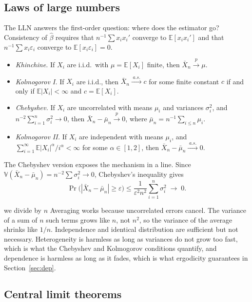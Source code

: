 \documentclass[11pt,a4paper]{article}
\newcommand{\E}{\mathbb{E}}
\newcommand{\V}{\mathbb{V}}
\newcommand{\cp}{\xrightarrow{\;p\;}}
\newcommand{\cas}{\xrightarrow{\;a.s.\;}}
\newcommand{\bh}{\hat\beta}
\newcommand{\iid}{i.i.d.}
\begin{document}
\subsection{Laws of large numbers}

The LLN answers the first-order question: where does the estimator go? Consistency of $\bh$ requires that $n^{-1}\sum x_ix_i'$ converge to $\E[x_ix_i']$ and that $n^{-1}\sum x_i\varepsilon_i$ converge to $\E[x_i\varepsilon_i]=0$.

\begin{theorem}\leavevmode
\begin{itemize}
\item \emph{Khinchine.} If $X_i$ are \iid\ with $\mu=\E[X_i]$ finite, then $\bar X_n\cp\mu$.
\item \emph{Kolmogorov I.} If $X_i$ are \iid, then $\bar X_n\cas c$ for some finite constant $c$ if and only if $\E|X_i|<\infty$ and $c=\E[X_i]$.
\item \emph{Chebyshev.} If $X_i$ are uncorrelated with means $\mu_i$ and variances $\sigma_i^2$, and $n^{-2}\sum_{i=1}^n\sigma_i^2\to0$, then $\bar X_n-\bar\mu_n\cp0$, where $\bar\mu_n=n^{-1}\sum_{i\le n}\mu_i$.
\item \emph{Kolmogorov II.} If $X_i$ are independent with means $\mu_i$, and $\sum_{i=1}^\infty\E|X_i|^\alpha/i^\alpha<\infty$ for some $\alpha\in[1,2]$, then $\bar X_n-\bar\mu_n\cas0$.
\end{itemize}
\end{theorem}

The Chebyshev version exposes the mechanism in a line. Since $\V(\bar X_n-\bar\mu_n)=n^{-2}\sum\sigma_i^2\to0$, Chebyshev's inequality gives
\[
\Pr\big(|\bar X_n-\bar\mu_n|\geq\varepsilon\big)\leq\frac{1}{\varepsilon^2n^2}\sum_{i=1}^n\sigma_i^2\;\longrightarrow\;0 .
\]

\begin{whybox}{we divide by $n$}
Averaging works because uncorrelated errors cancel. The variance of a sum of $n$ such terms grows like $n$, not $n^2$, so the variance of the average shrinks like $1/n$. Independence and identical distribution are sufficient but not necessary. Heterogeneity is harmless as long as variances do not grow too fast, which is what the Chebyshev and Kolmogorov conditions quantify, and dependence is harmless as long as it fades, which is what ergodicity guarantees in Section~\ref{sec:dep}.
\end{whybox}

\subsection{Central limit theorems}
\end{document}
